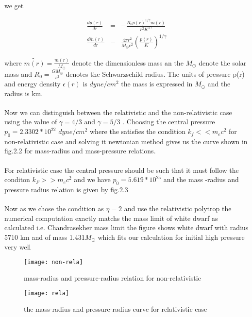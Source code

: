 \documentclass{report}
\begin{document}
\paragraph{}
 we get 
\begin{center}
\begin{eqnarray}
\frac{dp(r)}{dr} &=& -\frac{R_0 p(r)^{1/\gamma} m(r)}{r^2 K^{1\gamma}} \\
\label{46}
\frac{d\tilde{m}(r)}{dr} &=& \frac{4\pi r^2}{M_\odot c^2}\left( \frac{p(r)}{K}\right)^{1/\gamma}
\label{47}
\end{eqnarray}
\end{center}
where $\tilde{m(r)}= \frac{m(r)}{M_\odot}$ denote the dimensionless mass an the $M_\odot$ denote the  solar mass and $R_0= \frac{GM_\odot}{c^2}$ denotes the Schwarzschild radius. The units of pressure p(r) and energy density $\epsilon(r)$ is $dyne/cm^2$  the mass is expressed in $M_\odot$ and the radius is km.
\paragraph{ }
Now we can distinguish between the relativistic and the non-relativistic case using the value of $\gamma =4/3$ and $\gamma =5/3$
. Choosing the central pressure $p_0 = 2.3302 \ast 10^22$ $dyne/cm^2$
 where the satisfies the condition $k_f << m_ec^2$  for non-relativistic case and solving it newtonian method gives us the curve shown in fig.2.2 for mass-radius and mass-pressure relations.
 \paragraph{ }
 For relativistic case the central pressure should be such that it must follow the conditon $k_F>> m_e c^2$  and we have $p_0 = 5.619 \ast 10^25$  and the mass -radius and pressure radius relation is given by fig.2.3
\paragraph{ }
Now as we chose the condition as $\eta =2 $ and use the relativistic polytrop the numerical computation exactly matchs the mass limit of white dwarf as calculated i.e. Chandrasekher mass limit the figure shows white dwarf with radius 5710 km and of mass 1.431$M_\odot$ which fits our calculation for initial high pressure very well 
\begin{center}
\begin{figure}
\texttt{[image: non-rela]}
\caption{ mass-radius and pressure-radius relation for non-relativistic}
\end{figure}
\end{center}
\begin{center}
\begin{figure}
\texttt{[image: rela]}
\caption{ the mass-radius and pressure-radius curve for relativistic case}
\end{figure}
\end{center}
\end{document}
